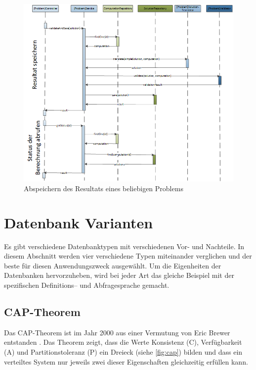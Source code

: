 \begin{figure}[h]
\centering
\includegraphics[scale=0.72]{images/visio/sequenz_diagramm_result.png}
\caption[Abspeichern des Resultats eines beliebigen Problems]{Abspeichern des Resultats eines beliebigen Problems \selfmade{}}
\label{fig:sequenz_diagramm_result}
\end{figure}

\section{Datenbank Varianten}\label{db_varianten}
Es gibt verschiedene Datenbanktypen mit verschiedenen Vor- und Nachteile. In diesem Abschnitt werden vier verschiedene Typen miteinander verglichen und der beste für diesen 
Anwendungszweck ausgewählt. Um die Eigenheiten der Datenbanken hervorzuheben, wird bei jeder Art das gleiche Beispiel mit der spezifischen Definitions-- und Abfragesprache gemacht.

\subsection{CAP-Theorem}\label{cap_theorem}
Das CAP-Theorem ist im Jahr 2000 aus einer Vermutung von Eric Brewer entstanden \cite{cap_brewer}. Das Theorem zeigt, dass die Werte Konsistenz (C), Verfügbarkeit (A) und Partitionstoleranz (P) ein 
Dreieck (siehe \autoref{fig:cap}) bilden und dass ein verteiltes System nur jeweils zwei dieser Eigenschaften gleichzeitig erfüllen kann.

